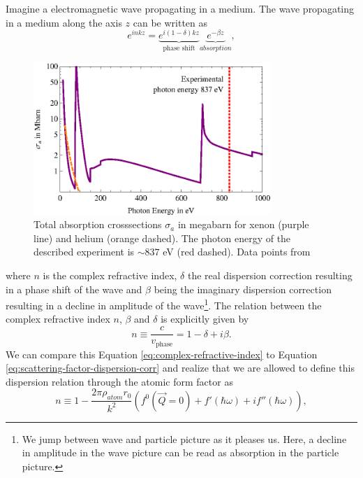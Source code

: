 Imagine a electromagnetic wave propagating in a medium. The wave propagating in a medium along the axis $z$ can be written as
\begin{equation}
e^{i n k z}= \underbrace{e^{i \left(1-\delta\right)k z}}_{\text{phase shift}}\underbrace{e^{-\beta z}}_{absorption},
\label{eq:wave-in-medium}
\end{equation}
\begin{figure}
	\centering
		\includegraphics[width=0.80\textwidth]{images/photoionization.eps}
	\caption[Total absorption cross-sections for helium and xenon.]{Total absorption crosssections $\sigma_{a}$ in megabarn for xenon (purple line) and helium (orange dashed). The photon energy of the described experiment is $\sim 837$ eV (red dashed). Data points from \citep{Elettra-2016-Website,Yeh-1985-AtmDat,Yeh-1993-GBSP}}
	\label{fig:photoionization}
\end{figure}
where $n$ is the complex refractive index, $\delta$ the real dispersion correction resulting in a phase shift of the wave and $\beta$ being the imaginary dispersion correction resulting in a decline in amplitude of the wave\footnote{We jump between wave and particle picture as it pleases us. Here, a decline in amplitude in the wave picture can be read as absorption in the particle picture.}. The relation between the complex refractive index $n$, $\beta$ and $\delta$ is explicitly given by
\begin{equation}
n\equiv \frac{c}{v_{\text{phase}}}=1-\delta+i\beta.
\label{eq:complex-refractive-index}
\end{equation}
We can compare this Equation \eqref{eq:complex-refractive-index} to Equation \eqref{eq:scattering-factor-dispersion-corr} and realize that we are allowed to define this dispersion relation through the atomic form factor as \citep[see][p.~76]{Als-Nielson-2011-JWS}
\begin{equation}
n\equiv 1- \frac{2\pi \rho_{atom}r_{0}}{k^{2}}\left(f^{0}\left(\vec{Q}=0\right)+f'\left(\hbar\omega\right)+i f''\left(\hbar\omega\right)\right),
\label{eq:eq:complex-refractive-index-atomic-factors}
\end{equation}
